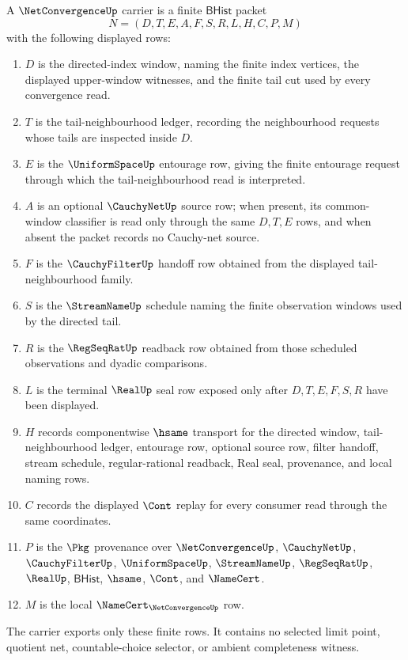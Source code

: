 \begin{definition}
\label{def:net-convergence-carrier}
A $\NetConvergenceUp$ carrier is a finite $\mathsf{BHist}$ packet
$$
N=(D,T,E,A,F,S,R,L,H,C,P,M)
$$
with the following displayed rows:
\begin{enumerate}
\item $D$ is the directed-index window, naming the finite index vertices, the displayed upper-window witnesses, and the finite tail cut used by every convergence read.
\item $T$ is the tail-neighbourhood ledger, recording the neighbourhood requests whose tails are inspected inside $D$.
\item $E$ is the $\UniformSpaceUp$ entourage row, giving the finite entourage request through which the tail-neighbourhood read is interpreted.
\item $A$ is an optional $\CauchyNetUp$ source row; when present, its common-window classifier is read only through the same $D,T,E$ rows, and when absent the packet records no Cauchy-net source.
\item $F$ is the $\CauchyFilterUp$ handoff row obtained from the displayed tail-neighbourhood family.
\item $S$ is the $\StreamNameUp$ schedule naming the finite observation windows used by the directed tail.
\item $R$ is the $\RegSeqRatUp$ readback row obtained from those scheduled observations and dyadic comparisons.
\item $L$ is the terminal $\RealUp$ seal row exposed only after $D,T,E,F,S,R$ have been displayed.
\item $H$ records componentwise $\hsame$ transport for the directed window, tail-neighbourhood ledger, entourage row, optional source row, filter handoff, stream schedule, regular-rational readback, Real seal, provenance, and local naming rows.
\item $C$ records the displayed $\Cont$ replay for every consumer read through the same coordinates.
\item $P$ is the $\Pkg$ provenance over $\NetConvergenceUp$, $\CauchyNetUp$, $\CauchyFilterUp$, $\UniformSpaceUp$, $\StreamNameUp$, $\RegSeqRatUp$, $\RealUp$, $\mathsf{BHist}$, $\hsame$, $\Cont$, and $\NameCert$.
\item $M$ is the local $\NameCert_{\NetConvergenceUp}$ row.
\end{enumerate}
The carrier exports only these finite rows. It contains no selected limit point, quotient net, countable-choice selector, or ambient completeness witness.
\end{definition}

